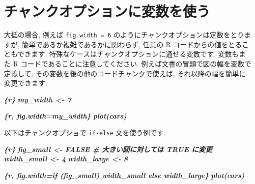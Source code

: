 \documentclass[
  11pt,
  lualatex,ja=standard,jafont=noto]{bxjsreport}
\newenvironment{Shaded}{\begin{snugshade}}{\end{snugshade}}
\newcommand{\InformationTok}[1]{\textcolor[rgb]{0.56,0.35,0.01}{\textbf{\textit{#1}}}}
\begin{document}
\begin{Shaded}
\end{Shaded}

\hypertarget{chunk-variable}{%
\section{チャンクオプションに変数を使う}\label{chunk-variable}}

大抵の場合, 例えば \texttt{fig.width = 6} のようにチャンクオプションは定数をとりますが, 簡単であるか複雑であるかに関わらず, 任意の R コードからの値をとることもできます. 特殊なケースはチャンクオプションに通せる変数です. 変数もまた R コードであることに注意してください. 例えば文書の冒頭で図の幅を変数で定義して, その変数を後の他のコードチャンクで使えば, それ以降の幅を簡単に変更できます.

\begin{Shaded}
\begin{Highlighting}[]
\InformationTok{\textasciigrave{}\textasciigrave{}\textasciigrave{}\{r\}}
\InformationTok{my\_width \textless{}{-} 7}
\InformationTok{\textasciigrave{}\textasciigrave{}\textasciigrave{}}

\InformationTok{\textasciigrave{}\textasciigrave{}\textasciigrave{}\{r, fig.width=my\_width\}}
\InformationTok{plot(cars)}
\InformationTok{\textasciigrave{}\textasciigrave{}\textasciigrave{}}
\end{Highlighting}
\end{Shaded}

以下はチャンクオプショで \texttt{if-else} 文を使う例です.

\begin{Shaded}
\begin{Highlighting}[]
\InformationTok{\textasciigrave{}\textasciigrave{}\textasciigrave{}\{r\}}
\InformationTok{fig\_small \textless{}{-} FALSE  \# 大きい図に対しては TRUE に変更}
\InformationTok{width\_small \textless{}{-} 4}
\InformationTok{width\_large \textless{}{-} 8}
\InformationTok{\textasciigrave{}\textasciigrave{}\textasciigrave{}}

\InformationTok{\textasciigrave{}\textasciigrave{}\textasciigrave{}\{r, fig.width=if (fig\_small) width\_small else width\_large\}}
\InformationTok{plot(cars)}
\InformationTok{\textasciigrave{}\textasciigrave{}\textasciigrave{}}
\end{Highlighting}
\end{Shaded}
\end{document}
